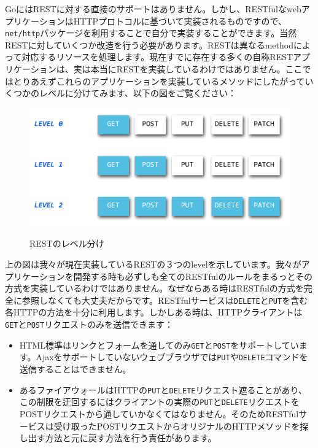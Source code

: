 GoにはRESTに対する直接のサポートはありません。しかし、RESTfulなwebアプリケーションはHTTPプロトコルに基づいて実装されるものですので、\texttt{net/http}パッケージを利用することで自分で実装することができます。当然RESTに対していくつか改造を行う必要があります。RESTは異なるmethodによって対応するリソースを処理します。現在すでに存在する多くの自称RESTアプリケーションは、実は本当にRESTを実装しているわけではありません。ここではとりあえずこれらのアプリケーションを実装しているメソッドにしたがっていくつかのレベルに分けてみます、以下の図をご覧ください：



\begin{figure}[H]
   \includegraphics[width=14cm]{8.3.rest3.png}
   \label{図8.7}
   \caption{RESTのレベル分け}
\end{figure}


上の図は我々が現在実装しているRESTの３つのlevelを示しています。我々がアプリケーションを開発する時も必ずしも全てのRESTfulのルールをまるっとその方式を実装しているわけではありません。なぜならある時はRESTfulの方式を完全に参照しなくても大丈夫だからです。RESTfulサービスは\texttt{DELETE}と\texttt{PUT}を含む各HTTPの方法を十分に利用します。しかしある時は、HTTPクライアントは\texttt{GET}と\texttt{POST}リクエストのみを送信できます：

\begin{itemize}
  \item HTML標準はリンクとフォームを通してのみ\texttt{GET}と\texttt{POST}をサポートしています。Ajaxをサポートしていないウェブブラウザでは\texttt{PUT}や\texttt{DELETE}コマンドを送信することはできません。
  \item あるファイアウォールはHTTPの\texttt{PUT}と\texttt{DELETE}リクエスト遮ることがあり、この制限を迂回するにはクライアントの実際の\texttt{PUT}と\texttt{DELETE}リクエストをPOSTリクエストから通していかなくてはなりません。そのためRESTfulサービスは受け取ったPOSTリクエストからオリジナルのHTTPメソッドを探し出す方法と元に戻す方法を行う責任があります。
\end{itemize}

